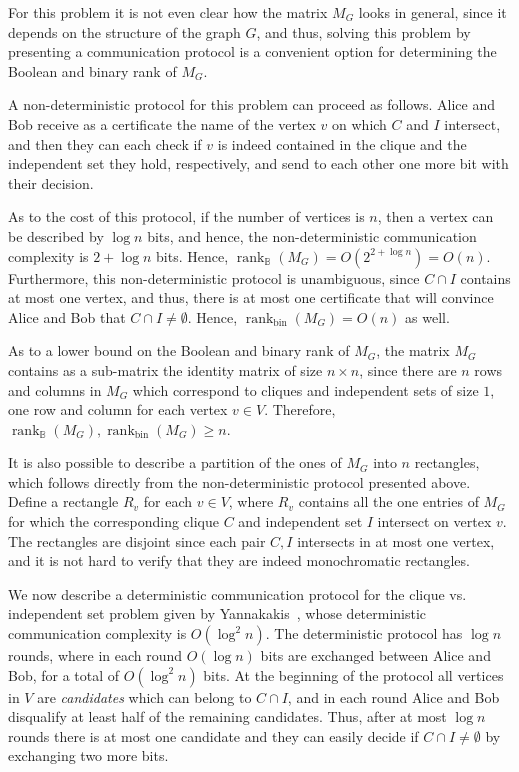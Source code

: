 \documentclass[11pt]{article}
\newcommand{\rank}{\mathop{\mathrm{rank}}}
\newcommand{\Rbool}{{\rank}_\mathbb{B}}
\newcommand{\Rbin}{{\rank}_{\mathrm{bin}}}
\begin{document}
For this problem it is not even clear how the matrix $M_G$ looks in general, since it depends on the structure of the graph $G$,
and thus, solving this problem by presenting a communication protocol is a convenient option for determining the Boolean and binary rank of $M_G$.

A non-deterministic protocol for this problem can proceed as follows. Alice and Bob receive as a certificate the name of the vertex $v$ on which $C$ and $I$ intersect,
and then they can each check if $v$ is indeed contained in the clique and the independent set they hold, respectively, and send to each other one more bit with their decision.

As to the cost of this protocol, if the number of vertices is $n$, then a vertex can be described by $\log n$ bits, and hence, the non-deterministic communication complexity
is $2 + \log n$ bits. Hence, $\Rbool(M_G) = O(2^{2 + \log n}) = O(n)$.
Furthermore, this non-deterministic protocol is unambiguous, since $C \cap I$ contains at most one vertex,
and thus, there is at most one certificate that will convince Alice and Bob that $C \cap I \neq \emptyset$. Hence, $\Rbin(M_G) = O(n)$ as well.

As to a lower bound on the Boolean and binary rank of $M_G$, the matrix $M_G$ contains as a sub-matrix the identity matrix of size $n\times n$,
since there are $n$ rows and columns in $M_G$ which correspond to cliques and independent sets of size $1$, one row and column for each vertex $v \in V$.
Therefore, $\Rbool(M_G), \Rbin(M_G) \geq n$.

It is also possible to describe a partition of the ones of $M_G$ into $n$ rectangles, which follows directly from the non-deterministic protocol presented above.
Define a rectangle $R_v$ for each $v \in V$, where $R_v$ contains all the one entries of $M_G$ for which the corresponding clique $C$ and independent set $I$ intersect on vertex $v$.
The rectangles are disjoint since each pair $C,I$ intersects in at most one vertex, and it is not hard to verify that they are indeed monochromatic rectangles.

We now describe a deterministic communication protocol for the clique vs. independent set problem given by Yannakakis~\cite{Yannakakis91},
whose deterministic communication complexity is $O(\log ^2 n)$.
The deterministic protocol has $\log n$ rounds, where in each round $O(\log n)$ bits are exchanged between Alice and Bob, for a total of $O(\log ^2 n)$ bits.
At the beginning of the protocol all vertices in $V$ are {\em candidates} which can belong to $C \cap I$, and
in each round Alice and Bob disqualify at least half of the remaining candidates.
Thus, after at most $\log n$ rounds there is at most one candidate and they can easily decide if $C \cap I \neq \emptyset$ by exchanging two more bits.
\end{document}
